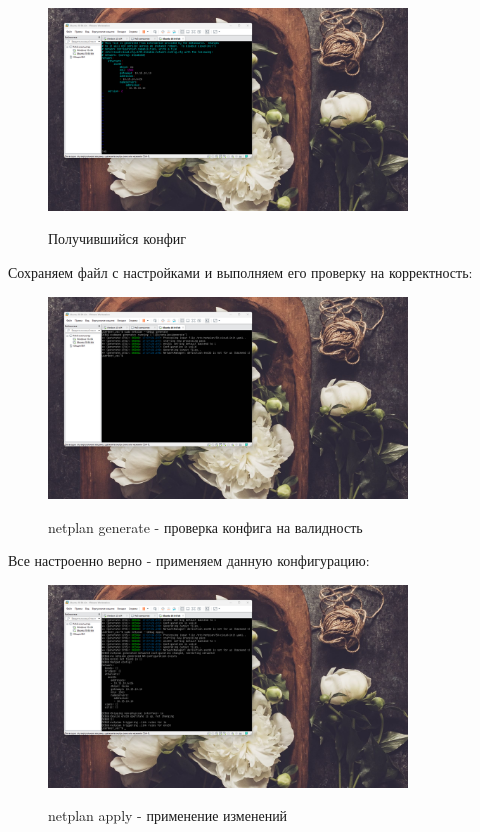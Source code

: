 \documentclass[a4paper]{article}
\begin{document}
  \begin{figure}[H]
    \centering
    \includegraphics[width=0.85\textwidth]{06_00 (35)}
    \label{img:35}
    \caption{Получившийся конфиг}
  \end{figure}
  
  Сохраняем файл с настройками и выполняем его проверку на корректность:

  \begin{figure}[H]
    \centering
    \includegraphics[width=0.85\textwidth]{06_00 (36)}
    \label{img:36}
    \caption{netplan generate - проверка конфига на валидность}
  \end{figure}
  
  Все настроенно верно - применяем данную конфигурацию:

  \begin{figure}[H]
    \centering
    \includegraphics[width=0.85\textwidth]{06_00 (37)}
    \label{img:37}
    \caption{netplan apply - применение изменений}
  \end{figure}
  
\end{document}
